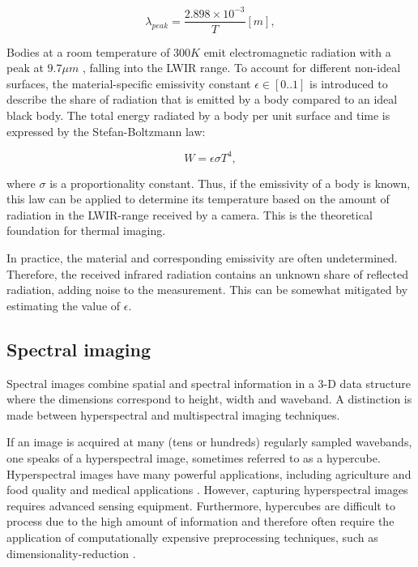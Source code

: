 \documentclass{l4proj}
\begin{document}
\begin{equation}
  \lambda_{peak} = \frac{2.898 \times 10^{-3}}{T} [m],
\end{equation}

Bodies at a room temperature of $300 K$ emit electromagnetic radiation with a peak at $9.7 \mu m$ \citep{jarc_graz_2007}, falling into the LWIR range. To account for different non-ideal surfaces, the material-specific emissivity constant $\epsilon \in [0..1]$ is introduced to describe the share of radiation that is emitted by a body compared to an ideal black body. The total energy radiated by a body per unit surface and time is expressed by the Stefan-Boltzmann law:

\begin{equation}
  W = \epsilon \sigma T^4,
\end{equation}

where $\sigma$ is a proportionality constant. Thus, if the emissivity of a body is known, this law can be applied to determine its temperature based on the amount of radiation in the LWIR-range received by a camera. This is the theoretical foundation for thermal imaging. 

In practice, the material and corresponding emissivity are often undetermined. Therefore, the received infrared radiation contains an unknown share of reflected radiation, adding noise to the measurement. This can be somewhat mitigated by estimating the value of $\epsilon$.

\subsection{Spectral imaging}

Spectral images combine spatial and spectral information in a 3-D data structure where the dimensions correspond to height, width and waveband. 
A distinction is made between hyperspectral and multispectral imaging techniques. 

If an image is acquired at many (tens or hundreds) regularly sampled wavebands, one speaks of a hyperspectral image, sometimes referred to as a hypercube. Hyperspectral images have many powerful applications, including agriculture and food quality \citep{dale_hyperspectral_2013} and medical applications \citep{lu_medical_2014}. However, capturing hyperspectral images requires advanced sensing equipment. Furthermore, hypercubes are difficult to process due to the high amount of information and therefore often require the application of computationally expensive preprocessing techniques, such as dimensionality-reduction \citep{qin_hyperspectral_2013}.
\end{document}
